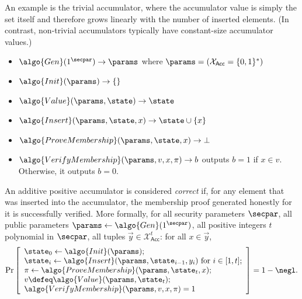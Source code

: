 \begin{example}
  An example is the trivial accumulator\label{sec:trivial-acc}, where the accumulator value is simply the set itself and therefore grows linearly with the number of inserted elements.
  (In contrast, non-trivial accumulators typically have constant-size accumulator values.)
  \begin{itemize}
    \item $\algo{Gen}(1^\secpar)\rightarrow \params$ where $\params = (\mathcal{X}_\mathsf{Acc} = \{0,1\}^*)$
    \item $\algo{Init}(\params)\rightarrow \{\}$
    \item $\algo{Value}(\params, \state)\rightarrow \state$
    \item $\algo{Insert}(\params, \state, x) \rightarrow \state \cup \{x\}$
    \item $\algo{ProveMembership}(\params, \state, x) \rightarrow \bot$
    \item $\algo{VerifyMembership}(\params, v, x, \pi) \rightarrow b$ outputs $b = 1$ if $x \in v$. Otherwise, it outputs $b = 0$.
  \end{itemize}
\end{example}

\begin{definition}[Correctness]
An additive positive accumulator is considered \emph{correct} if, for any element that was inserted into the accumulator, the membership proof generated honestly for it is successfully verified.
More formally, for all security parameters $\secpar$, all public parameters $\params \gets \algo{Gen}(1^\secpar)$, all positive integers $t$ polynomial in $\secpar$, all tuples $\vec{y} \in \mathcal{X}_\mathsf{Acc}^{t}$: for all $x \in \vec{y}$,
\[
    \Pr\left[
    \begin{array}{l}
        \state_0 \gets \algo{Init}(\params); \\
        \state_i \gets \algo{Insert}(\params, \state_{i - 1}, y_i) \text{ for } i \in [1, t]; \\
        \pi \gets \algo{ProveMembership}(\params, \state_t, x); \\
        v \defeq \algo{Value}(\params, \state_t); \\
        \algo{VerifyMembership}(\params, v, x, \pi) = 1
    \end{array}
    \right] = 1 - \negl.
\]
\end{definition}

